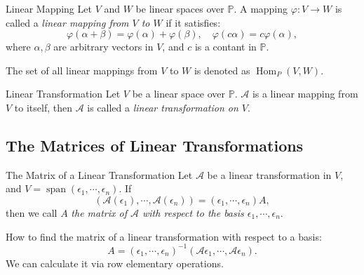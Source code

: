 \begin{definition}{Linear Mapping}{}
  Let $V$ and $W$ be linear spaces over $\mathbb{P}$.
  A mapping $\varphi: V \rightarrow W$ is called a \emph{linear mapping from $V$
  to $W$}
  if it satisfies:
  \begin{equation}
    \varphi(\alpha + \beta) = \varphi(\alpha) + \varphi(\beta), \quad
    \varphi(c \alpha) = c \varphi(\alpha),
  \end{equation}
  where $\alpha, \beta$ are arbitrary vectors in $V$,
  and $c$ is a contant in $\mathbb{P}$.
\end{definition}

\begin{note}
  The set of all linear mappings from $V$ to $W$ is denoted as $\operatorname{Hom}_P(V, W)$.
\end{note}

\begin{definition}{Linear Transformation}{}
  Let $V$ be a linear space over $\mathbb{P}$.
  $\mathcal{A}$ is a linear mapping from $V$ to itself,
  then $\mathcal{A}$ is called a \emph{linear transformation on $V$}.
\end{definition}

\subsection{The Matrices of Linear Transformations}

\begin{definition}{The Matrix of a Linear Transformation}{}
  Let $\mathcal{A}$ be a linear transformation in $V$,
  and $V = \operatorname{span} (\epsilon_1,\cdots,\epsilon_n)$.
  If
  \begin{equation}
    (\mathcal{A}(\epsilon_1),\cdots,\mathcal{A}(\epsilon_n)) = (\epsilon_1,\cdots,\epsilon_n)A,
  \end{equation}
  then we call $A$ \emph{the matrix of $\mathcal{A}$ with respect to the basis $\epsilon_1,\cdots,\epsilon_n$}.
\end{definition}

\begin{note}
  How to find the matrix of a linear transformation with respect to a basis:
  \begin{equation}
    A = (\epsilon_1,\cdots,\epsilon_n)^{-1}(\mathcal{A}\epsilon_1,\cdots,\mathcal{A}\epsilon_n).
  \end{equation}
  We can calculate it via row elementary operations.
\end{note}

